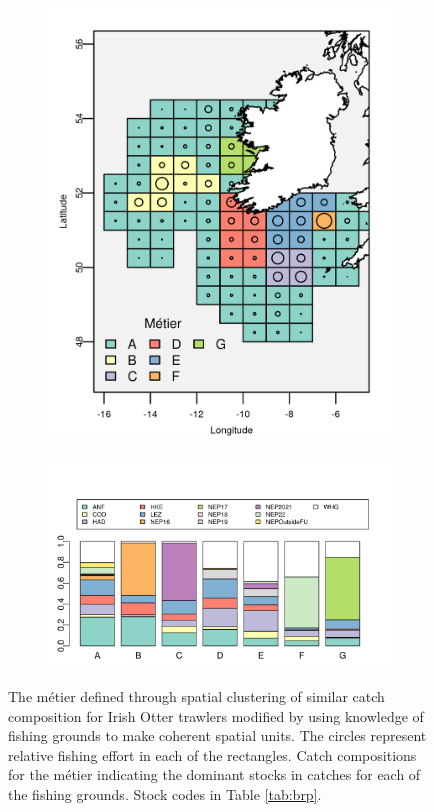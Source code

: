 \documentclass[12pt, halfline, a4paper]{ouparticle}
\begin{document}
\begin{figure}[!ht]
	\centering
\begin{subfigure}
	\centering
	\includegraphics[width=0.6\linewidth]{figures/Final_Metier_locations}
\end{subfigure}
\begin{subfigure}
	\centering
	\includegraphics[width=0.8\linewidth]{figures/Final_Metier_catchcomp}
\end{subfigure}
\caption{The métier defined through spatial clustering of similar catch
	composition for Irish Otter trawlers modified by using knowledge of
	fishing grounds to make coherent spatial units. The circles represent
	relative fishing effort in each of the rectangles. Catch compositions
	for the métier indicating the dominant stocks in catches for each of
	the fishing grounds. Stock codes in Table \ref{tab:brp}.} 
	\label{fig:metier}

\end{figure}	
\end{document}
